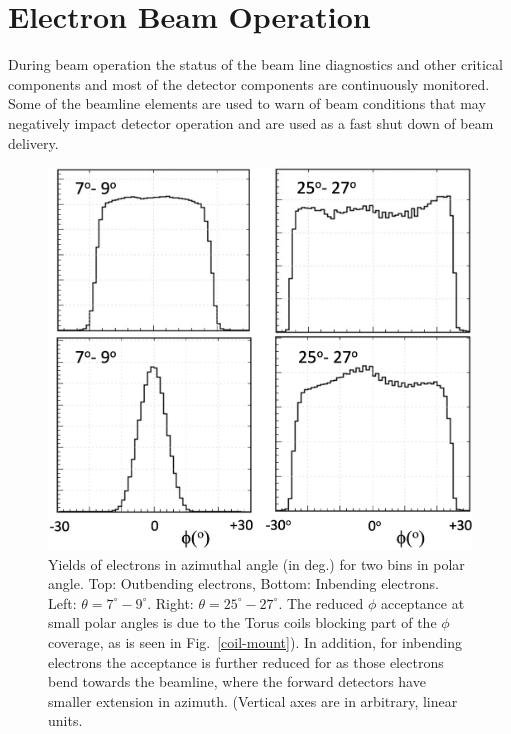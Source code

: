 \documentclass[final,3p,twocolumn]{elsarticle}
\begin{document}
\section{Electron Beam Operation} 
During beam operation the status of the beam line diagnostics and other critical components and most of the 
detector components are continuously monitored. Some of the beamline elements are used to warn of beam 
conditions that may negatively impact detector operation and are used as a fast shut down of beam delivery.    


\begin{figure}[t!]
\centerline{\includegraphics[width=1.0\columnwidth]{e1_R1_phi-out-in.png}}
\caption{Yields of electrons in azimuthal angle (in deg.) for two bins in polar
  angle. Top: Outbending electrons, Bottom: Inbending electrons. 
  Left: $\theta = 7^\circ-9^\circ$. Right: $\theta = 25^\circ-27^\circ$.  The
  reduced $\phi$ acceptance at small polar angles is due to the Torus coils blocking part of the $\phi$ 
  coverage, as is seen in Fig.~\ref{coil-mount}).
  In addition, for inbending electrons the acceptance is further reduced for as those electrons bend 
  towards the beamline, where the forward detectors have smaller extension in azimuth. 
  (Vertical axes are in arbitrary, linear units. }
\label{e-accept-in}
\end{figure}

\end{document}
